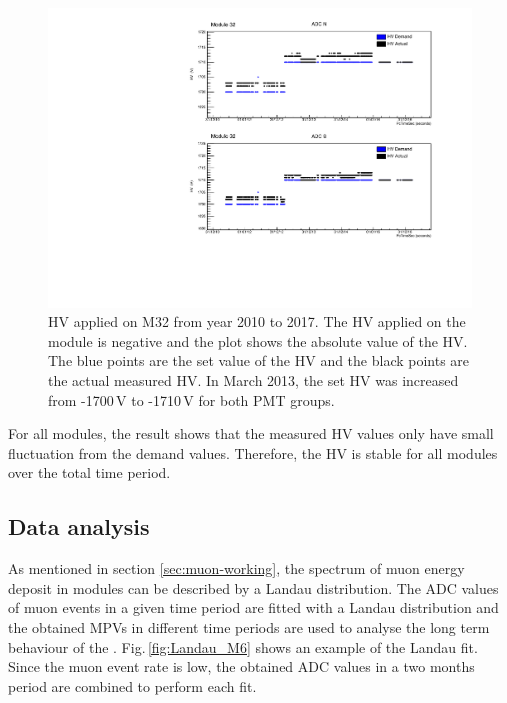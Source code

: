 \begin{figure}[htb!]
  \centering
  \includegraphics[width=0.9\textwidth{}]{./fig/HVPlot_M32.pdf}
  \caption{HV applied on M32 from year 2010 to 2017. The HV applied on the module is negative and the plot shows the absolute value of the HV. The blue points are the set value of the HV and the black points are the actual measured HV. In March 2013, the set HV was increased from -1700\,V to -1710\,V for both PMT groups.}
  \label{fig:HV_32}
\end{figure}

For all modules, the result shows that the measured HV values only have small fluctuation from the demand values. Therefore, the HV is stable for all modules over the total time period.

\subsection{Data analysis}
As mentioned in section \ref{sec:muon-working}, the spectrum of muon energy deposit in modules can be described by a Landau distribution. The ADC values of muon events in a given time period are fitted with a Landau distribution and the obtained MPVs in different time periods are used to analyse the long term behaviour of the \mvs.  Fig.\,\ref{fig:Landau_M6} shows an example of the Landau fit. Since the muon event rate is low, the obtained ADC values in a two months period are combined to perform each fit.

